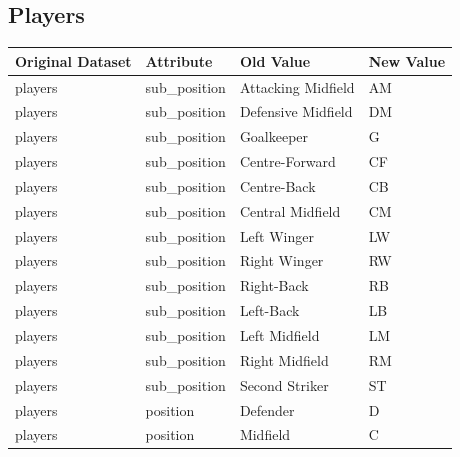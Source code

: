 \documentclass{Configuration_Files/PoliMi3i_thesis}
\begin{document}
\subsection{Players}
\begin{table}[ht]
	\centering
	\begin{tabular}{|l|l|l|l|}
		\hline
    \rowcolor{bluepoli!40}
		\textbf{Original Dataset} & \textbf{Attribute} & \textbf{Old Value} & \textbf{New Value} \\ \hline
		players                   & sub\_position      & Attacking Midfield & AM                 \\ \hline
		players                   & sub\_position      & Defensive Midfield & DM                 \\ \hline
		players                   & sub\_position      & Goalkeeper         & G                  \\ \hline
		players                   & sub\_position      & Centre-Forward     & CF                 \\ \hline
		players                   & sub\_position      & Centre-Back        & CB                 \\ \hline
		players                   & sub\_position      & Central Midfield   & CM                 \\ \hline
		players                   & sub\_position      & Left Winger        & LW                 \\ \hline
		players                   & sub\_position      & Right Winger       & RW                 \\ \hline
		players                   & sub\_position      & Right-Back         & RB                 \\ \hline
		players                   & sub\_position      & Left-Back          & LB                 \\ \hline
		players                   & sub\_position      & Left Midfield      & LM                 \\ \hline
		players                   & sub\_position      & Right Midfield     & RM                 \\ \hline
		players                   & sub\_position      & Second Striker     & ST                 \\ \hline
		players                   & position           & Defender           & D                  \\ \hline
		players                   & position           & Midfield           & C                  \\ \hline

\end{tabular}
\end{table}
\end{document}
